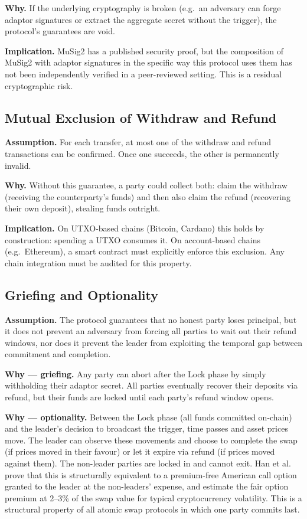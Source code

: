 \documentclass[11pt,a4paper]{article}
\begin{document}
\textbf{Why.}\;
If the underlying cryptography is broken (e.g.\ an adversary can forge
adaptor signatures or extract the aggregate secret without the trigger),
the protocol's guarantees are void.

\textbf{Implication.}\;
MuSig2 has a published security proof, but the composition of MuSig2 with
adaptor signatures in the specific way this protocol uses them has not been
independently verified in a peer-reviewed setting.
This is a residual cryptographic risk.

\subsection{Mutual Exclusion of Withdraw and Refund}

\textbf{Assumption.}\;
For each transfer, at most one of the withdraw and refund transactions can
be confirmed.
Once one succeeds, the other is permanently invalid.

\textbf{Why.}\;
Without this guarantee, a party could collect both: claim the withdraw
(receiving the counterparty's funds) and then also claim the refund
(recovering their own deposit), stealing funds outright.

\textbf{Implication.}\;
On UTXO-based chains (Bitcoin, Cardano) this holds by construction:
spending a UTXO consumes it.
On account-based chains (e.g.\ Ethereum), a smart contract must
explicitly enforce this exclusion.
Any chain integration must be audited for this property.

\subsection{Griefing and Optionality}
\label{sec:griefing}

\textbf{Assumption.}\;
The protocol guarantees that no honest party loses principal, but it does
not prevent an adversary from forcing all parties to wait out their refund
windows, nor does it prevent the leader from exploiting the temporal gap
between commitment and completion.

\textbf{Why --- griefing.}\;
Any party can abort after the Lock phase by simply withholding their
adaptor secret.
All parties eventually recover their deposits via refund, but their funds
are locked until each party's refund window opens.

\textbf{Why --- optionality.}\;
Between the Lock phase (all funds committed on-chain) and the leader's
decision to broadcast the trigger, time passes and asset prices move.
The leader can observe these movements and choose to complete the swap (if
prices moved in their favour) or let it expire via refund (if prices moved
against them).
The non-leader parties are locked in and cannot exit.
Han et al.~\cite{han2019optionality} prove that this is structurally
equivalent to a premium-free American call option granted to the leader at
the non-leaders' expense, and estimate the fair option premium at 2--3\%
of the swap value for typical cryptocurrency volatility.
This is a structural property of all
atomic swap protocols in which one party
commits last.
\end{document}

